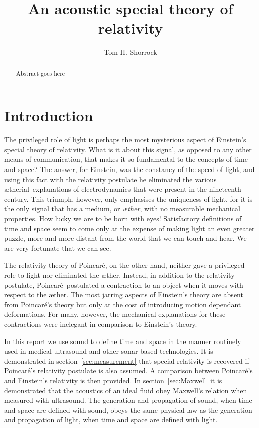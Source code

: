 \documentclass[10pt, fleqn,final,showtrims,oldfontcommands, article,a4paper,oneside]{memoir} %
\title{An acoustic special theory of relativity}
\author{Tom H. Shorrock}
\newcommand{\aether}{\ae ther}
\newcommand{\aetherial}{\ae therial}
\newcommand{\Poincare}{Poincar{\'e}}
\begin{document}
\maketitle

\begin{abstract}
Abstract goes here
\end{abstract}

\section{Introduction}\label{sec:introduction}

The privileged role of light is perhaps the most mysterious aspect of Einstein's special theory of relativity.
What is it about this signal, as opposed to any other means of communication, that makes it  so fundamental to the  concepts of time and space?
The answer, for Einstein, was the constancy of the speed of light,
and using this fact with the relativity postulate he eliminated the  various \aetherial\ explanations of electrodynamics that were present in the nineteenth century.
This triumph, however, only emphasises the uniqueness of light, for it is the  only  signal that has a  medium, or {\em \aether}, with no measurable mechanical properties.
How lucky we are to be born with eyes! %
Satisfactory definitions of time and space seem to come only at the expense of making light  an even greater puzzle,
more and more distant from the world that we can touch and hear.
We are very fortunate that we can see.

The relativity theory of \Poincare, on the other hand,  neither gave a privileged role to light nor eliminated the \aether.
Instead, in addition to the relativity postulate, \Poincare\ postulated a  contraction to an object  when it moves with respect to the \aether.
The most jarring aspects of Einstein's theory are absent from \Poincare's theory but only at the cost of introducing motion dependant deformations.
For many, however, the mechanical explanations for these contractions were inelegant in comparison to Einstein's theory.

In this report we use sound to define time and space 
in the manner  routinely used in medical ultrasound and other sonar-based technologies.
It is demonstrated in section~\ref{sec:measurement} that special relativity is recovered if \Poincare's relativity postulate is also assumed.
A comparison between \Poincare's and Einstein's relativity is then provided.
In section~\ref{sec:Maxwell} it is demonstrated that the acoustics of an ideal fluid obey Maxwell's relation when measured with ultrasound.
The generation and propagation of sound,  when time and space are defined with  sound,
obeys the same physical law as the generation and propagation of light,  when time and space are defined with light.
\end{document}
